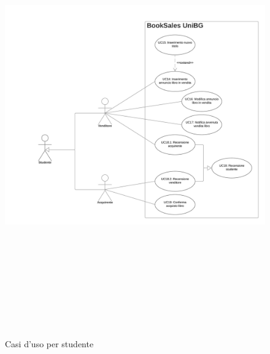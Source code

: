 \documentclass[10pt,a4paper]{report}
\begin{document}
	\begin{figure}[H]
		\centering
		\includegraphics[height=19cm, width=17cm, keepaspectratio]{sb_uc}
		\caption{Casi d'uso per studente}
	\end{figure}
\end{document}
